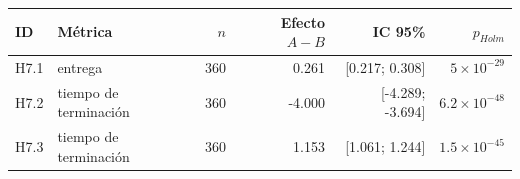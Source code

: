 \begin{tabular}{llrrrr}
\toprule
ID & Métrica & $n$ & Efecto $A-B$ & IC 95\% & $p_{Holm}$ \\
\midrule
H7.1 & entrega & 360 & 0.261 & [0.217; 0.308] & \(5\times10^{-29}\) \\
H7.2 & tiempo de terminación & 360 & -4.000 & [-4.289; -3.694] & \(6.2\times10^{-48}\) \\
H7.3 & tiempo de terminación & 360 & 1.153 & [1.061; 1.244] & \(1.5\times10^{-45}\) \\
\bottomrule
\end{tabular}
